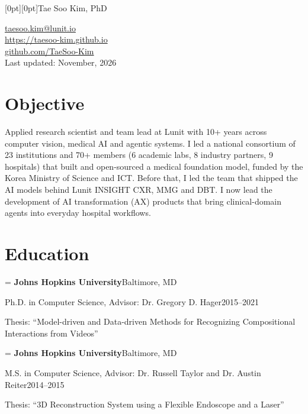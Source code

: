 \documentclass[11pt,letterpaper]{article}
\makeatletter
\newlength{\entryindent}\setlength{\entryindent}{13.94pt}
\newcommand{\entry}[4]{%
  \par\if@nobreak\vskip 2.3pt\else\vskip 8.3pt\fi
  {\leftskip=\entryindent\rightskip=1.87pt
   \textbf{#1}\hfill #2\par\nobreak\vskip 1.5pt
   {\small #3\hfill #4\par}}\nobreak}
\newenvironment{cvitemsdark}
  {\begin{cvitems}[label={\bfseries --}, before=\small\color{ink}, topsep=4.1pt, after=\vspace{-3.8pt}]}
  {\end{cvitems}}
\makeatother
\begin{document}
\raisebox{-17.4pt}[0pt][0pt]{\Huge\color{accent}Tae Soo Kim, PhD}%
\hfill
\begin{minipage}[t]{0.45\textwidth}
  \raggedleft
  \href{mailto:taesoo.kim@lunit.io}{taesoo.kim@lunit.io}\\
  \href{https://taesoo-kim.github.io/}{https://taesoo-kim.github.io}\\
  \href{https://github.com/TaeSoo-Kim/}{github.com/TaeSoo-Kim}\\
  Last updated: November, 2026
\end{minipage}\hspace{22.7pt}

\section*{Objective}
Applied research scientist and team lead at Lunit with 10+ years across computer vision, medical AI and agentic systems.
I led a national consortium of 23 institutions and 70+ members (6 academic labs, 8 industry partners, 9 hospitals)
that built and open-sourced a medical foundation model, funded by the Korea Ministry of Science and ICT.
Before that, I led the team that shipped the AI models behind Lunit INSIGHT CXR, MMG and DBT.
I now lead the development of AI transformation (AX) products
that bring clinical-domain agents into everyday hospital workflows.

\section*{Education}

\entry{Johns Hopkins University}{Baltimore, MD}
      {Ph.D. in Computer Science, Advisor: Dr. Gregory D. Hager}{2015--2021}
\begin{cvitemsdark}
  \item Thesis: ``Model-driven and Data-driven Methods for Recognizing Compositional Interactions from Videos''
\end{cvitemsdark}

\entry{Johns Hopkins University}{Baltimore, MD}
      {M.S. in Computer Science, Advisor: Dr. Russell Taylor and Dr. Austin Reiter}{2014--2015}
\begin{cvitemsdark}
  \item Thesis: ``3D Reconstruction System using a Flexible Endoscope and a Laser''
\end{cvitemsdark}
\end{document}
